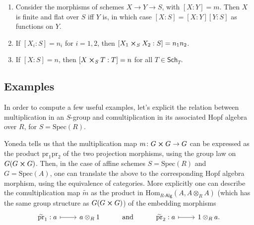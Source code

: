 \begin{prop}\leavevmode\vspace{-.2\baselineskip}
\begin{enumerate}
	\item Consider the morphisms of schemes $X \to Y \to S$, with $[X:Y] = m$.
		Then $X$ is finite and flat over $S$ iff $Y$ is, in which case
		$[X:S] = [X:Y] [Y:S]$ as functions on $Y$.
		
	\item If $[X_i:S] = n_i$ for $i=1,2$, then
		$[X_1 \cross_{ S } X_2 : S] = n_1n_2$.

	\item If $[X:S] = n$, then $[X \cross_{ S } T : T] = n$
		for all $T \in \mathsf{Sch}_{ T }$.
\end{enumerate}
\end{prop}


\subsection{Examples}
In order to compute a few useful examples, let's explicit the relation between
multiplication in an $S$-group and comultiplication in its associated Hopf algebra over
$R$, for $S = \mathrm{Spec}(R)$.
\begin{rem}\label{rem:ExplicitComult}
	Yoneda tells us that the multiplication map 
	$m\colon G \cross G \to G$ can be expressed
	as the product $\mathrm{pr}_1 \mathrm{pr}_2$
	of the two projection morphisms, using the group law
	on $G(G \cross G)$.
	Then, in the case of affine schemes $S = \mathrm{Spec}(R)$
	and $G = \mathrm{Spec}(A)$, one can translate the above to the corresponding
	Hopf algebra morphism, using the equivalence of categories.
	More explicitly one can describe the comultiplication map
	$\widetilde{m}$ as the product in 
	$\mathrm{Hom}_{R\text{-}\mathsf{Alg}} \left( A, A \otimes_R A \right)$ 
	(which has the same group structure as $G(G \cross G)$)
	of the embedding morphisms
	\begin{equation*}
	\begin{tikzcd}
		\widetilde{\mathrm{pr}}_1: a \arrow[r, "", mapsto] &
		a \otimes_R 1 &
		\text{and} &
		\widetilde{\mathrm{pr}}_2: a \arrow[r, "", mapsto] &
		1 \otimes_R a
	.\end{tikzcd}
	\end{equation*}
\end{rem}


